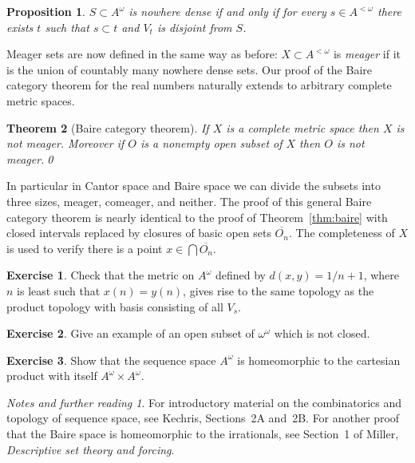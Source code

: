 \documentclass[11pt,oneside,a4paper]{amsbook}
\theoremstyle{definition}
\newtheorem{exercise}{Exercise}[section]
\theoremstyle{plain}
\newtheorem{theorem}{Theorem}[section]
\newtheorem{proposition}[theorem]{Proposition}
\theoremstyle{definition}
\theoremstyle{remark}
\newtheorem*{notes}{Notes and further reading}
\numberwithin{equation}{section}
\numberwithin{figure}{section}
\begin{document}
\begin{proposition}
  \label{prop:cantor-space-nwd}
  $S\subset A^\omega$ is nowhere dense if and only if for every $s\in A^{<\omega}$ there exists $t$ such that $s\subset t$ and $V_t$ is disjoint from $S$.
\end{proposition}

Meager sets are now defined in the same way as before: $X\subset A^{<\omega}$ is \emph{meager} if it is the union of countably many nowhere dense sets. Our proof of the Baire category theorem for the real numbers naturally extends to arbitrary complete metric spaces.

\begin{theorem}[Baire category theorem]
  If $X$ is a complete metric space then $X$ is not meager. Moreover if $O$ is a nonempty open subset of $X$ then $O$ is not meager.\qed
\end{theorem}

In particular in Cantor space and Baire space we can divide the subsets into three sizes, meager, comeager, and neither. The proof of this general Baire category theorem is nearly identical to the proof of Theorem~\ref{thm:baire} with closed intervals replaced by closures of basic open sets $\overline{O_n}$. The completeness of $X$ is used to verify there is a point $x\in\bigcap\overline{O_n}$.


\begin{exercise}
  Check that the metric on $A^\omega$ defined by $d(x,y)=1/{n+1}$, where $n$ is least such that $x(n)=y(n)$, gives rise to the same topology as the product topology with basis consisting of all $V_s$.
\end{exercise}

\begin{exercise}
  Give an example of an open subset of $\omega^\omega$ which is not closed.
\end{exercise}

\begin{exercise}
  Show that the sequence space $A^\omega$ is homeomorphic to the cartesian product with itself $A^\omega\times A^\omega$.
\end{exercise}

\begin{notes}
  For introductory material on the combinatorics and topology of sequence space, see Kechris, Sections~2A and~2B. For another proof that the Baire space is homeomorphic to the irrationals, see Section~1 of Miller, \emph{Descriptive set theory and forcing}.
\end{notes}
\end{document}
